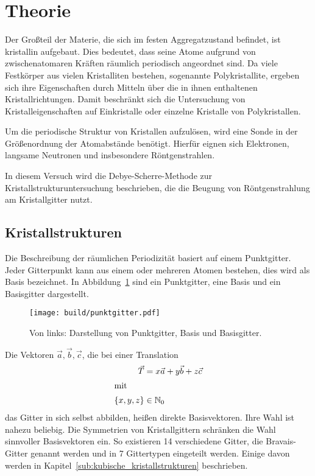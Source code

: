 \section{Theorie}\label{sec:Theorie}
\nocite{anleitung}

Der Großteil der Materie, die sich im festen Aggregatzustand befindet,
ist kristallin aufgebaut.
Dies bedeutet, dass seine Atome aufgrund von zwischenatomaren Kräften räumlich periodisch angeordnet sind.
Da viele Festkörper aus vielen Kristalliten bestehen, sogenannte Polykristallite,
ergeben sich ihre Eigenschaften durch Mitteln über die in ihnen enthaltenen Kristallrichtungen.
Damit beschränkt sich die
Untersuchung von Kristalleigenschaften auf Einkristalle oder einzelne Kristalle
von Polykristallen.

Um die periodische Struktur von Kristallen aufzulösen, wird eine Sonde in der
Größenordnung der Atomabstände benötigt.
Hierfür eignen sich Elektronen, langsame Neutronen und insbesondere Röntgenstrahlen.

In diesem Versuch wird die Debye-Scherre-Methode zur Kristallstrukturuntersuchung beschrieben,
die die Beugung von Röntgenstrahlung am Kristallgitter nutzt.

\subsection{Kristallstrukturen}%
\label{sub:kristallstrukturen}
Die Beschreibung der räumlichen Periodizität basiert auf einem Punktgitter.
Jeder Gitterpunkt kann aus einem oder mehreren Atomen bestehen,
dies wird als Basis bezeichnet.
In Abbildung~\ref{fig:punktgitter} sind ein Punktgitter, eine Basis und ein Basisgitter
dargestellt.
\begin{figure}
  \centering
  \texttt{[image: build/punktgitter.pdf]}
  \caption{Von links: Darstellung von Punktgitter, Basis und Basisgitter.\cite{anleitung}}%
  \label{fig:punktgitter}
\end{figure}

Die Vektoren $\vec{a}, \vec{b}, \vec{c}$, die bei einer Translation
\begin{align}
  \vec{T} &= x\vec{a} + y\vec{b} + z\vec{c} \\
  \intertext{mit}
  \left\{x, y, z\right\} &\in \mathbb{N}_0
\end{align}
das Gitter in sich selbst abbilden, heißen direkte Basisvektoren.
Ihre Wahl ist nahezu beliebig.
Die Symmetrien von Kristallgittern schränken die Wahl sinnvoller Basisvektoren ein.
So existieren 14 verschiedene Gitter, die Bravais-Gitter genannt werden
und in 7 Gittertypen eingeteilt werden.
Einige davon werden in Kapitel~\ref{sub:kubische_kristallstrukturen} beschrieben.


